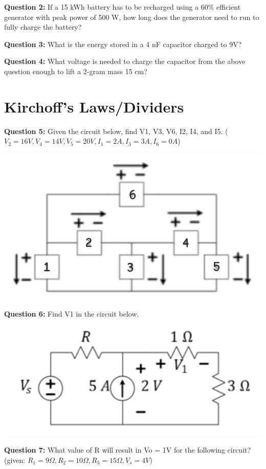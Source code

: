 \documentclass{article}
\begin{document}
\textbf{Question 2:} If a 15 kWh battery has to be recharged using a 60\% efficient generator with peak power of 500 W, how long does the generator need to run to fully charge the battery?

\textbf{Question 3:} What is the energy stored in a 4 nF capacitor charged to 9V?

\textbf{Question 4:} What voltage is needed to charge the capacitor from the above question enough to lift a 2-gram mass 15 cm?

\section*{Kirchoff's Laws/Dividers}

\textbf{Question 5:} Given the circuit below, find V1, V3, V6, I2, I4, and I5. ($V_2=16V, V_4=14V, V_5=20V, I_1=2A, I_3=3A, I_6=0A$)

\begin{center}
    \includegraphics[width=0.75\linewidth]{figures/2.png}
\end{center}

\textbf{Question 6:} Find V1 in the circuit below.

\begin{center}
    \includegraphics[width=0.75\linewidth]{figures/3.png}
\end{center}

\textbf{Question 7:} What value of R will result in Vo = 1V for the following circuit? (given: $R_1=9\Omega, R_2=10\Omega, R_3=15\Omega, V_s=4V$)
\end{document}
